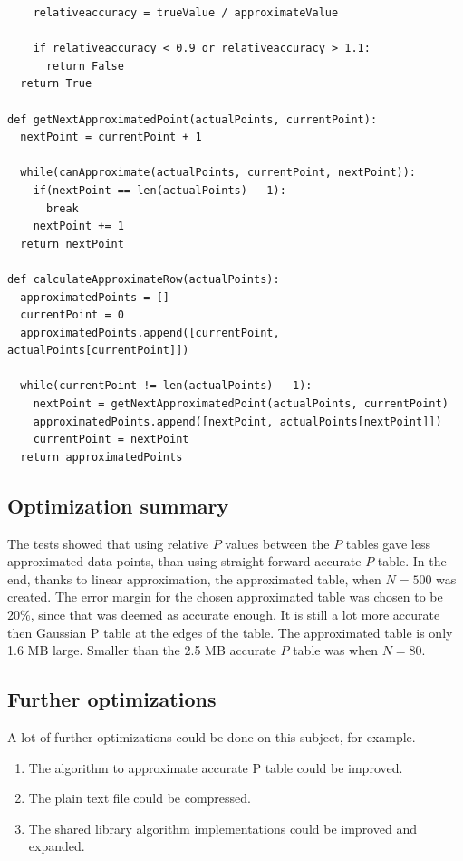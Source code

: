 \documentclass[12pt]{article}
\begin{document}
{\begin{lstlisting}
    relativeaccuracy = trueValue / approximateValue

    if relativeaccuracy < 0.9 or relativeaccuracy > 1.1:
      return False
  return True

def getNextApproximatedPoint(actualPoints, currentPoint):
  nextPoint = currentPoint + 1

  while(canApproximate(actualPoints, currentPoint, nextPoint)):
    if(nextPoint == len(actualPoints) - 1):
      break
    nextPoint += 1
  return nextPoint

def calculateApproximateRow(actualPoints):
  approximatedPoints = []
  currentPoint = 0
  approximatedPoints.append([currentPoint, actualPoints[currentPoint]])

  while(currentPoint != len(actualPoints) - 1):
    nextPoint = getNextApproximatedPoint(actualPoints, currentPoint)
    approximatedPoints.append([nextPoint, actualPoints[nextPoint]])
    currentPoint = nextPoint
  return approximatedPoints

\end{lstlisting}

\subsection{Optimization summary}
The tests showed that using relative $P$ values between the $P$ tables gave less approximated data points, than using straight forward accurate $P$ table. In the end, thanks to linear approximation, the approximated table, when $N=500$ was created. The error margin for the chosen approximated table was chosen to be $20\%$, since that was deemed as accurate enough. It is still a lot more accurate then Gaussian P table at the edges of the table. The approximated table is only 1.6 MB large. Smaller than the 2.5 MB accurate $P$ table was when $N=80$.

\subsection{Further optimizations}
A lot of further optimizations could be done on this subject, for example.

\begin{enumerate}
\item The algorithm to approximate accurate P table could be improved.
\item The plain text file could be compressed.
\item The shared library algorithm implementations could be improved and expanded.
\end{enumerate}

}
\end{document}

